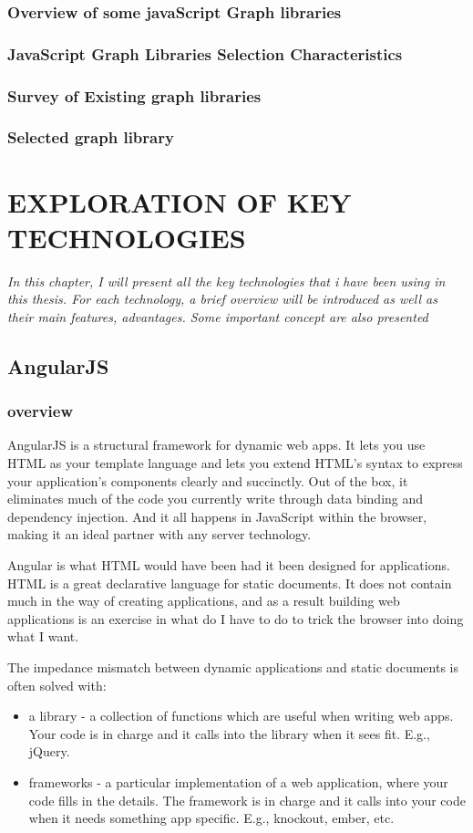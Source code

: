 \documentclass[14pt,a4paper]{extreport}
\begin{document}
 		\subsection{Overview of some javaScript Graph libraries}
		\subsection{JavaScript Graph Libraries Selection Characteristics} 		
		\subsection{Survey of Existing graph libraries }
		\subsection{Selected graph library}	

\chapter{EXPLORATION OF KEY TECHNOLOGIES}
\textsl{In this chapter, I will present all the key technologies that i have been using in this thesis. For each technology, a brief overview will be introduced as well as their main features, advantages. Some important concept are also presented}

	\section{AngularJS}
		\subsection{overview}
		AngularJS is a structural framework for dynamic web apps. It lets you use HTML as your template language and lets you extend HTML's syntax to express your application's components clearly and succinctly. Out of the box, it eliminates much of the code you currently write through data binding and dependency injection. And it all happens in JavaScript within the browser, making it an ideal partner with any server technology.

Angular is what HTML would have been had it been designed for applications. HTML is a great declarative language for static documents. It does not contain much in the way of creating applications, and as a result building web applications is an exercise in what do I have to do to trick the browser into doing what I want.

The impedance mismatch between dynamic applications and static documents is often solved with:
\begin{itemize}
\item a library - a collection of functions which are useful when writing web apps. Your code is in charge and it calls into the library when it sees fit. E.g., jQuery.
\item frameworks - a particular implementation of a web application, where your code fills in the details. The framework is in charge and it calls into your code when it needs something app specific. E.g., knockout, ember, etc.

\end{itemize}
\end{document}
